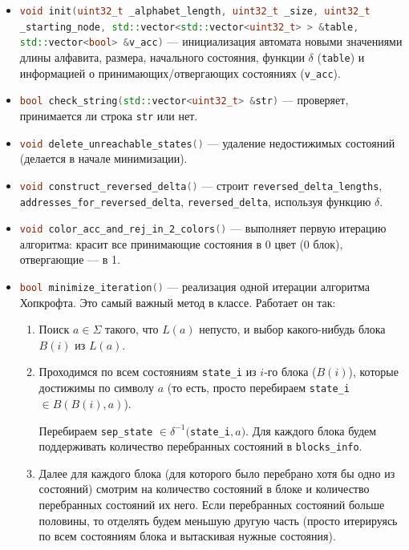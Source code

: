 \documentclass{article}
\begin{document}
\begin{itemize}
  \item[\ding{228}] \lstinline[language=C++]!void init(uint32_t _alphabet_length, uint32_t _size, uint32_t _starting_node, std::vector<std::vector<uint32_t> > &table, std::vector<bool> &v_acc)! --- инициализация автомата новыми значениями длины алфавита, размера, начального состояния, функции $\delta$ (\lstinline[language=C++]!table!) и информацией о принимающих/отвергающих состояниях (\lstinline[language=C++]!v_acc!).
  \item[\ding{228}] \lstinline[language=C++]!bool check_string(std::vector<uint32_t> &str)! --- проверяет, принимается ли строка \lstinline[language=C++]!str! или нет.
  \item[\ding{228}] \lstinline[language=C++]!void delete_unreachable_states()! --- удаление недостижимых состояний (делается в начале минимизации).
  \item[\ding{228}] \lstinline[language=C++]!void construct_reversed_delta()! --- строит \lstinline[language=C++]!reversed_delta_lengths!, \lstinline[language=C++]!addresses_for_reversed_delta!, \lstinline[language=C++]!reversed_delta!, используя функцию $\delta$.
  \item[\ding{228}] \lstinline[language=C++]!void color_acc_and_rej_in_2_colors()! --- выполняет первую итерацию алгоритма: красит все принимающие состояния в 0 цвет (0 блок), отвергающие --- в 1.
  \item[\ding{228}] \lstinline[language=C++]!bool minimize_iteration()! --- реализация одной итерации алгоритма Хопкрофта. Это самый важный метод в классе. Работает он так:
  \begin{enumerate}
    \item Поиск $a \in \Sigma$ такого, что $L(a)$ непусто, и выбор какого-нибудь блока $B(i)$ из $L(a)$.
    \item Проходимся по всем состояниям \lstinline[language=C++]!state_i! из $i$-го блока ($B(i)$), которые достижимы по символу $a$ (то есть, просто перебираем \lstinline[language=C++]!state_i! $\in \hat B(B(i), a)$).
    
    Перебираем \lstinline[language=C++]!sep_state! $\in \delta^{-1}($\lstinline[language=C++]!state_i!$, a)$. Для каждого блока будем поддерживать количество перебранных состояний в \lstinline[language=C++]!blocks_info!.

    \item Далее для каждого блока (для которого было перебрано хотя бы одно из состояний) смотрим на количество состояний в блоке и количество перебранных состояний их него. Если перебранных состояний больше половины, то отделять будем меньшую другую часть (просто итерируясь по всем состояниям блока и вытаскивая нужные состояния).
    

\end{enumerate}
\end{itemize}
\end{document}
